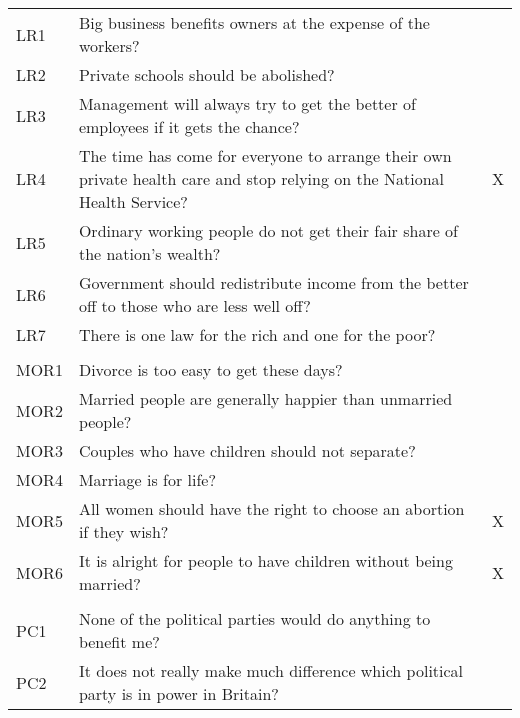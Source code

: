 \begin{tabular}{lll}
\hline
\hspace{1em}LR1 & Big business benefits owners at the expense of the workers? & \\
\hspace{1em}LR2 & Private schools should be abolished? & \\
\hspace{1em}LR3 & Management will always try to get the better of employees if it gets the chance? & \\
\hspace{1em}LR4 & The time has come for everyone to arrange their own private health care and stop relying on the National Health Service? & X\\
\hspace{1em}LR5 & Ordinary working people do not get their fair share of the nation's wealth? & \\
\hspace{1em}LR6 & Government should redistribute income from the better off to those who are less well off? & \\
\hspace{1em}LR7 & There is one law for the rich and one for the poor? & \\
\addlinespace[0.3em]
\multicolumn{3}{l}{\textbf{Morale (MOR)}}\\
\hline
\hspace{1em}MOR1 & Divorce is too easy to get these days? & \\
\hspace{1em}MOR2 & Married people are generally happier than unmarried people? & \\
\hspace{1em}MOR3 & Couples who have children should not separate? & \\
\hspace{1em}MOR4 & Marriage is for life? & \\
\hspace{1em}MOR5 & All women should have the right to choose an abortion if they wish? & X\\
\hspace{1em}MOR6 & It is alright for people to have children without being married? & X\\
\addlinespace[0.3em]
\multicolumn{3}{l}{\textbf{Political Cynicism (PC)}}\\
\hline
\hspace{1em}PC1 & None of the political parties would do anything to benefit me? & \\
\hspace{1em}PC2 & It does not really make much difference which political party is in power in Britain? & \\

\end{tabular}
